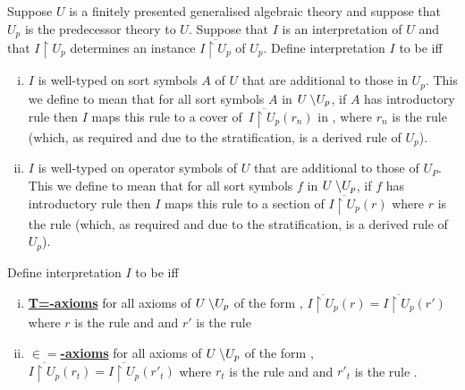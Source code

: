 \def\restrict{\mathbin{\restriction}}
\newcommand{\predInstance}{\overline{I \restrict U_p}}
\newcommand{\Uincrement}{U \setminus\kern-2pt U_p}

\begin{definition}
Suppose $U$ is a finitely presented generalised algebraic theory and 
suppose that $U_p$ is the predecessor theory to $U$. Suppose that $I$ is an interpretation of $U$  and that  $I \restrict U_p$  
determines an instance $\predInstance$ of $U_p$.
Define interpretation $I$ to be   iff 

\begin{enumerate}[(i)]
\item
$I$ is well-typed on sort symbols $A$ of $U$ that are additional to those in $U_p$. This we define to mean that
for all sort symbols $A$ in $\Uincrement$, if $A$ has introductory rule 
\genericAintroductoryrule then $I$ maps this rule to a cover of \,$\predInstance(r_n)$ in \catc, where $r_n$ is the rule 
 (which, as required and due to the stratification, is a derived rule of $U_p$).
\item  $I$ is well-typed on operator symbols  of $U$ that are additional to those of $U_P$. This we define to mean that
for all sort symbols $f$ in $\Uincrement$, if $f$ has introductory rule 
\genericfintroductoryrule then $I$ maps this rule to a section 
of $\predInstance(r)$ where $r$ is the rule
 (which, as required and due to the stratification, is a derived rule of $U_p$). 
\end{enumerate}

Define interpretation $I$ to be   iff  
\begin{enumerate}[(i)]
\item \underline{\textbf{T=-axioms}} 
for all axioms of $\Uincrement$ of the form
 ,
$\predInstance(r) = \predInstance(r')$ where $r$ is the rule
 and  
and $r'$ is the rule 
\item \underline{\textbf{$\boldsymbol{\in=}$-axioms}} 
for all axioms of $\Uincrement$ of the form
,
$\predInstance(r_t) = \predInstance(r'_t)$ where $r_t$ is the rule
 and  
and $r'_t$ is the rule .
\end{enumerate}
\end{definition}

